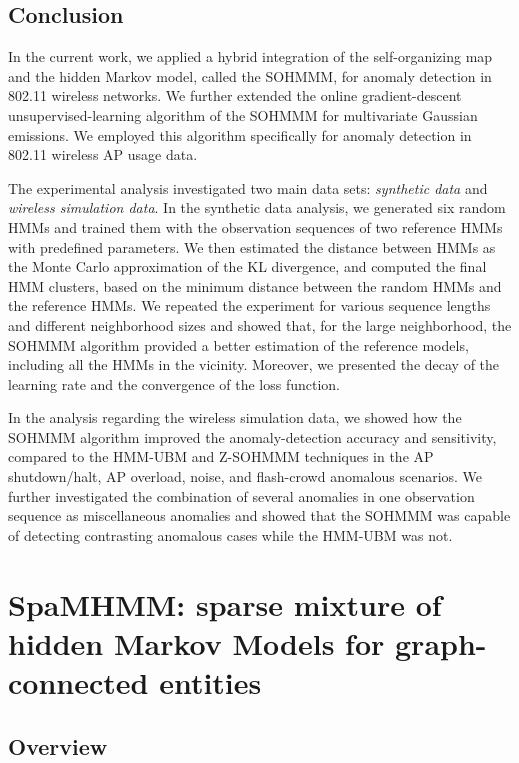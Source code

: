 \subsection{Conclusion}
\label{sec:sohmmm_conclusion}

In the current work, we applied a hybrid integration of the self-organizing map and the hidden Markov model, called the SOHMMM, for anomaly detection in 802.11 wireless networks. We further extended the online gradient-descent unsupervised-learning algorithm of the SOHMMM for multivariate Gaussian emissions. We employed this algorithm specifically for anomaly detection in 802.11 wireless AP usage data.

The experimental analysis investigated two main data sets: \textit{synthetic data} and \textit{wireless simulation data}. In the synthetic data analysis, we generated six random HMMs and trained them with the observation sequences of two reference HMMs with predefined parameters. We then estimated the distance between HMMs as the Monte Carlo approximation of the KL divergence, and computed the final HMM clusters, based on the minimum distance between the random HMMs and the reference HMMs. We repeated the experiment for various sequence lengths and different neighborhood sizes and showed that, for the large neighborhood, the SOHMMM algorithm provided a better estimation of the reference models, including all the HMMs in the vicinity. Moreover, we presented the decay of the learning rate and the convergence of the loss function.

In the analysis regarding the wireless simulation data, we showed how the SOHMMM algorithm improved the anomaly-detection accuracy and sensitivity, compared to the HMM-UBM and Z-SOHMMM techniques in the AP shutdown/halt, AP overload, noise, and flash-crowd anomalous scenarios. We further investigated the combination of several anomalies in one observation sequence as miscellaneous anomalies and showed that the SOHMMM was capable of detecting contrasting anomalous cases while the HMM-UBM was not.

\section{SpaMHMM: sparse mixture of hidden Markov Models for graph-connected entities}
\label{sec:spamhmm}

\subsection{Overview}

